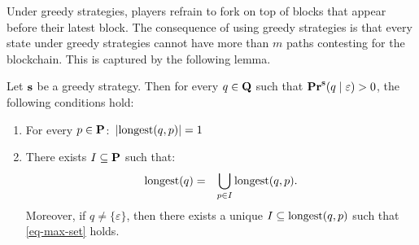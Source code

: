 Under greedy strategies, players refrain to fork on top of blocks that appear before their latest block.
The consequence of using 
greedy strategies is that every state 
under greedy strategies cannot have more than $m$ paths contesting for the blockchain. This is captured by the following lemma.
\begin{mylem}\label{lem-length-greedy}
Let $\mathbf{s}$ be a greedy strategy. Then for every $q \in \mathbf{Q}$ such that $\mathbf{Pr}^{\mathbf{s}}(q \mid \varepsilon) > 0$, the following conditions hold:
\begin{enumerate}
\item For every $p \in \mathbf{P}$$:$ $|{\text{\rm longest}}(q,p)| = 1$ 

\item There exists $I \subseteq \mathbf{P}$ such that$:$
\begin{eqnarray}\label{eq-max-set}
{\text{\rm longest}}(q) & = & \bigcup_{p \in I} {\text{\rm longest}}(q,p).
\end{eqnarray}
Moreover, if $q \neq \{\varepsilon\}$, then there exists a unique $I \subseteq {\text{\rm longest}}(q,p)$ such that \eqref{eq-max-set} holds.
\end{enumerate}
\end{mylem}

